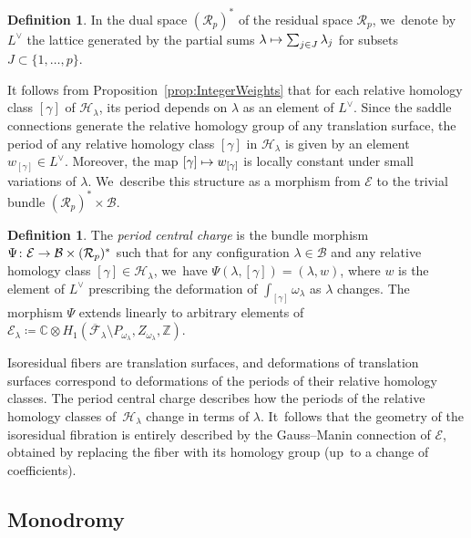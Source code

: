 \documentclass[JEP,XML,SOM,Unicode,NoFloatCountersInSection,published]{cedram}
\newcommand\mto{\mathchoice{\longmapsto}{\mapsto}{\mapsto}{\mapsto}}
\newcommand\ZZ{{\mathbb Z}}
\newcommand\calH{{\mathcal H}}
\newcommand\calE{{\mathcal E}}
\theoremstyle{definition}
\newtheorem{defn}[thm]{Definition}
\begin{document}

\begin{defn}\label{defn:DualLattice}
In the dual space $(\mathcal{R}_{p})^{\ast}$ of the residual space $\mathcal{R}_{p}$, we~denote by $L^{\vee}$ the lattice generated by the partial sums $\lambda \mto \sum_{j \in J} \lambda_j$ for subsets $J\subset \{1,\ldots,p\}$.
\end{defn}

It follows from Proposition~\ref{prop:IntegerWeights} that for each relative homology class $[\gamma]$ of $\calH_{\lambda}$, its period depends on $\lambda$ as an element of $L^{\vee}$. Since the saddle connections generate the relative homology group of any translation surface, the period of any relative homology class $[\gamma]$ in $\calH_{\lambda}$ is given by an element $w_{[\gamma]}\in L^{\vee}$. Moreover, the map $[\gamma]\mto w_{[\gamma]}$ is locally constant under small variations of $\lambda$. We~describe this structure as a morphism from $\mathcal{E}$ to the trivial bundle $(\mathcal{R}_{p})^{\ast} \times \mathcal{B}$.

\begin{defn}
The \textit{period central charge} is the bundle morphism $\Psi\colon\mathcal{E} \to \mathcal{B}\times\nobreak (\mathcal{R}_{p})^{\ast} $ such that for any configuration $\lambda \in \mathcal{B}$ and any relative homology class $[\gamma] \in \calH_{\lambda}$, we~have $\Psi(\lambda,[\gamma])=(\lambda,w)$, where $w$ is the element of $L^{\vee}$ prescribing the deformation of $\int_{[\gamma]} \omega_{\lambda}$ as $\lambda$ changes. The morphism $\Psi$ extends linearly to arbitrary elements of $\mathcal{E}_{\lambda} \coloneqq \mathbb{C} \otimes H_{1}(\overline{\mathcal{F}}_{\lambda} \setminus P_{\omega_{\lambda}}, Z_{\omega_{\lambda}},\ZZ)$.
\end{defn}

Isoresidual fibers are translation surfaces, and deformations of translation surfaces correspond to deformations of the periods of their relative homology classes. The period central charge describes how the periods of the relative homology classes of~$\calH_{\lambda}$ change in terms of $\lambda$. It~follows that the geometry of the isoresidual fibration is entirely described by the Gauss--Manin connection of $\calE$, obtained by replacing the fiber with its homology group (up~to a change of coefficients).

\subsection{Monodromy}\label{sub:Monodromy}
\end{document}
